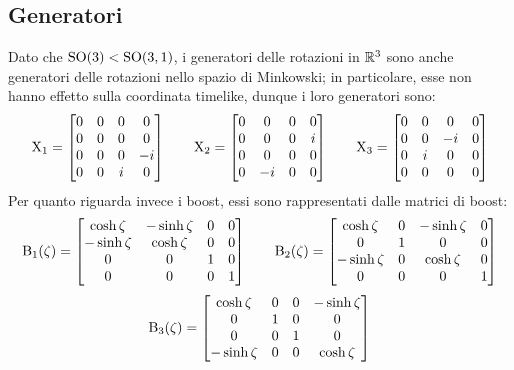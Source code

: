 \subsection{Generatori}

Dato che $ \mathrm{SO}(3) < \mathrm{SO}(3,1) $, i generatori delle rotazioni in $ \mathbb{R}^3 $ sono anche generatori delle rotazioni nello spazio di Minkowski; in particolare, esse non hanno effetto sulla coordinata timelike, dunque i loro generatori sono:
\begin{equation*}
	\mathrm{X}_1 =
	\begin{bmatrix}
		0 & 0 & 0 & 0 \\
		0 & 0 & 0 & 0 \\
		0 & 0 & 0 & -i \\
		0 & 0 & i & 0
	\end{bmatrix}
	\qquad
	\mathrm{X}_2 =
	\begin{bmatrix}
		0 & 0 & 0 & 0 \\
		0 & 0 & 0 & i \\
		0 & 0 & 0 & 0 \\
		0 & -i & 0 & 0
	\end{bmatrix}
	\qquad
	\mathrm{X}_3 =
	\begin{bmatrix}
		0 & 0 & 0 & 0 \\
		0 & 0 & -i & 0 \\
		0 & i & 0 & 0 \\
		0 & 0 & 0 & 0
	\end{bmatrix}
\end{equation*}
Per quanto riguarda invece i boost, essi sono rappresentati dalle matrici di boost:
\begin{equation*}
	\mathrm{B}_1(\zeta) =
	\begin{bmatrix}
		\cosh \zeta & -\sinh \zeta & 0 & 0 \\
		-\sinh \zeta & \cosh \zeta & 0 & 0 \\
		0 & 0 & 1 & 0 \\
		0 & 0 & 0 & 1
	\end{bmatrix}
	\qquad
	\mathrm{B}_2(\zeta) =
	\begin{bmatrix}
		\cosh \zeta & 0 & -\sinh \zeta & 0 \\
		0 & 1 & 0 & 0 \\
		-\sinh \zeta  & 0 & \cosh \zeta & 0 \\
		0 & 0 & 0 & 1
	\end{bmatrix}
\end{equation*}
\begin{equation*}
	\mathrm{B}_3(\zeta) =
	\begin{bmatrix}
		\cosh \zeta & 0 & 0 & -\sinh \zeta \\
		0 & 1 & 0 & 0 \\
		0 & 0 & 1 & 0 \\
		-\sinh \zeta & 0 & 0 & \cosh \zeta
	\end{bmatrix}
\end{equation*}
